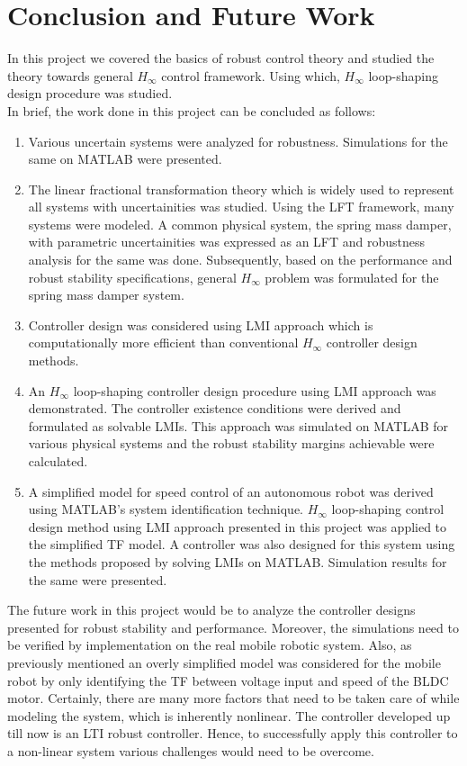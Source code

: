 \documentclass[a4paper,12pt]{article}
\begin{document}
	\section{Conclusion and Future Work}

In this project we covered the basics of robust control theory and studied the theory towards general $H_{\infty}$ control framework. Using which, $H_{\infty}$ loop-shaping design procedure was studied.\\ 
In brief, the work done in this project can be concluded as follows:
\begin{enumerate}
\item Various uncertain systems were analyzed for robustness. Simulations for the same on MATLAB were presented. 
\item The linear fractional transformation theory which is widely used to represent all systems with uncertainities was studied. Using the LFT framework, many systems were modeled. A common physical system, the spring mass damper, with parametric uncertainities was expressed as an LFT and robustness analysis for the same was done. Subsequently, based on the performance and robust stability specifications, general $H_{\infty}$ problem was formulated for the spring mass damper system. 
\item Controller design was considered using LMI approach which is computationally more efficient than conventional $H_{\infty}$ controller design methods. 
\item An $H_{\infty}$ loop-shaping controller design procedure using LMI approach was demonstrated. The controller existence conditions were derived and formulated as solvable LMIs. This approach was simulated on MATLAB for various physical systems and the robust stability margins achievable were calculated. 
\item A simplified model for speed control of an autonomous robot was derived using MATLAB's system identification technique. $H_{\infty}$ loop-shaping control design method using LMI approach presented in this project was applied to the simplified TF model. A controller was also designed for this system using the methods proposed by solving LMIs on MATLAB. Simulation results for the same were presented.
\end{enumerate}

The future work in this project would be to analyze the controller designs presented for robust stability and performance. Moreover, the simulations need to be verified by implementation on the real mobile robotic system. Also, as previously mentioned an overly simplified model was considered for the mobile robot by only identifying the TF between voltage input and speed of the BLDC motor. Certainly, there are many more factors that need to be taken care of while modeling the system, which is inherently nonlinear. The controller developed up till now is an LTI robust controller. Hence, to successfully apply this controller to a non-linear system various challenges would need to be overcome.
\printbibliography 
\end{document}
